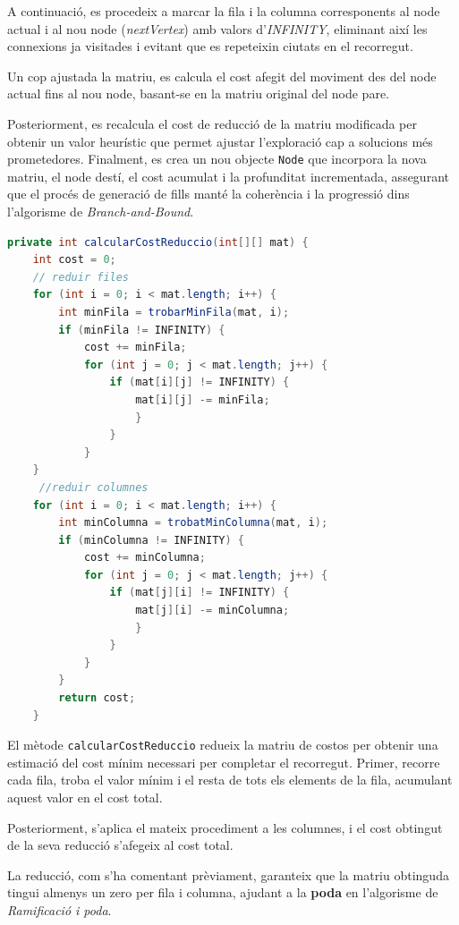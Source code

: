 \documentclass{ieeetj}
\begin{document}
A continuació, es procedeix a marcar la fila i la columna corresponents al node actual i al nou node (\textit{nextVertex}) amb valors d'\textit{INFINITY}, eliminant així les connexions ja visitades i evitant que es repeteixin ciutats en el recorregut.\newline

Un cop ajustada la matriu, es calcula el cost afegit del moviment des del node actual fins al nou node, basant-se en la matriu original del node pare. 

Posteriorment, es recalcula el cost de reducció de la matriu modificada per obtenir un valor heurístic que permet ajustar l'exploració cap a solucions més prometedores. 
Finalment, es crea un nou objecte \texttt{Node} que incorpora la nova matriu, el node destí, el cost acumulat i la profunditat incrementada, assegurant que el procés de generació de fills manté la coherència i la progressió dins l'algorisme de \textit{Branch-and-Bound}.


\begin{lstlisting}[language = JAVA, breaklines = true]
private int calcularCostReduccio(int[][] mat) {
    int cost = 0;
    // reduir files
    for (int i = 0; i < mat.length; i++) {
        int minFila = trobarMinFila(mat, i);
        if (minFila != INFINITY) {
            cost += minFila;
            for (int j = 0; j < mat.length; j++) {
                if (mat[i][j] != INFINITY) {
                    mat[i][j] -= minFila;
                    }
                }
            }
    }
     //reduir columnes
    for (int i = 0; i < mat.length; i++) {
        int minColumna = trobatMinColumna(mat, i);
        if (minColumna != INFINITY) {
            cost += minColumna;
            for (int j = 0; j < mat.length; j++) {
                if (mat[j][i] != INFINITY) {
                    mat[j][i] -= minColumna;
                    }
                }
            }
        }
        return cost;
    }    
\end{lstlisting}

El mètode \texttt{calcularCostReduccio} redueix la matriu de costos per obtenir una estimació del cost mínim necessari per completar el recorregut. Primer, recorre cada fila, troba el valor mínim i el resta de tots els elements de la fila, acumulant aquest valor en el cost total. 

Posteriorment, s’aplica el mateix procediment a les columnes, i el cost obtingut de la seva reducció s’afegeix al cost total.

La reducció, com s'ha comentant prèviament, garanteix que la matriu obtinguda tingui almenys un zero per fila i columna, ajudant a la \textbf{poda} en l'algorisme de \textit{Ramificació i poda}.
\end{document}
